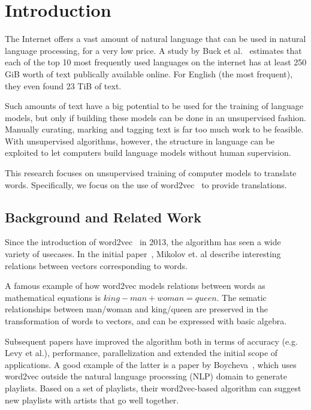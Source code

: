 \section{Introduction}
\label{sec:introduction}
The Internet offers a vast amount of natural language that can be used in natural language processing, for a very low price. A study by Buck et al.~\cite{buck2014n} estimates that each of the top 10 most frequently used languages on the internet has at least 250 GiB worth of text publically available online. For English (the most frequent), they even found 23 TiB of text.

Such amounts of text have a big potential to be used for the training of language models, but only if building these models can be done in an unsupervised fashion. Manually curating, marking and tagging text is far too much work to be feasible. With unsupervised algorithms, however, the structure in language can be exploited to let computers build language models without human supervision.

This research focuses on unsupervised training of computer models to translate words. Specifically, we focus on the use of word2vec~\cite{mikolov2013efficient} to provide translations.

\subsection{Background and Related Work}
\label{sec:prior_work}
Since the introduction of word2vec~\cite{mikolov2013efficient, mikolov2013distributed} in 2013, the algorithm has seen a wide variety of usecases. In the initial paper~\cite{mikolov2013efficient}, Mikolov et. al describe interesting relations between vectors corresponding to words.

A famous example of how word2vec models relations between words as mathematical equations is $king - man + woman = queen$.
The sematic relationships between man/woman and king/queen are preserved in the transformation of words to vectors, and can be expressed with basic algebra.

Subsequent papers have improved the algorithm both in terms of accuracy (e.g. Levy et al.\cite{levy2014linguistic}), performance, parallelization and extended the initial scope of applications. A good example of the latter is a paper by Boycheva~\cite{boycheva2015distributional}, which uses word2vec outside the natural language processing (NLP) domain to generate playlists. Based on a set of playlists, their word2vec-based algorithm can suggest new playlists with artists that go well together.

